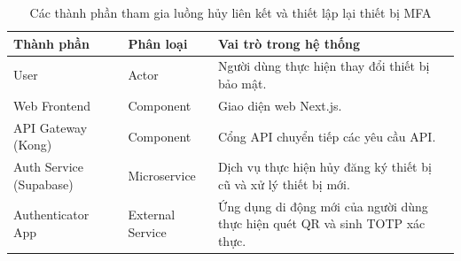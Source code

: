 \begin{table}[H]
\centering
\renewcommand{\arraystretch}{1.3}

\begin{tabular}{|l|l|p{5cm}|}
\hline
\textbf{Thành phần} & \textbf{Phân loại} & \textbf{Vai trò trong hệ thống} \\ \hline
User & Actor & Người dùng thực hiện thay đổi thiết bị bảo mật. \\ \hline
Web Frontend & Component & Giao diện web Next.js. \\ \hline
API Gateway (Kong) & Component & Cổng API chuyển tiếp các yêu cầu API. \\ \hline
Auth Service (Supabase) & Microservice & Dịch vụ thực hiện hủy đăng ký thiết bị cũ và xử lý thiết bị mới. \\ \hline
Authenticator App & External Service & Ứng dụng di động mới của người dùng thực hiện quét QR và sinh TOTP xác thực. \\ \hline
\end{tabular}
\caption{Các thành phần tham gia luồng hủy liên kết và thiết lập lại thiết bị MFA}
\end{table}
